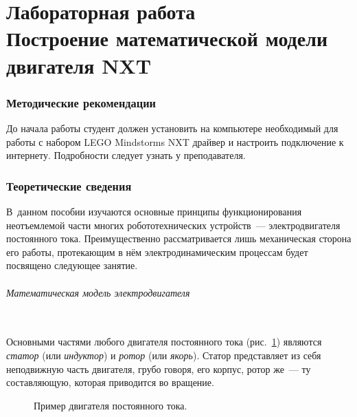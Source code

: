 \documentclass[12pt,a4paper,openany]{extarticle}
\begin{document}
\part*{Лабораторная работа \\
Построение математической модели двигателя NXT}

\section{Методические рекомендации}
\hspace*{\parindent}До начала работы студент должен установить на компьютере необходимый для работы с набором LEGO Mindstorms NXT драйвер и настроить подключение к интернету.
Подробности следует узнать у преподавателя. 

\section{Теоретические сведения}
\hspace*{\parindent}В~данном пособии изучаются основные принципы функционирования неотъемлемой части многих робототехнических устройств~--- электродвигателя постоянного тока.
Преимущественно рассматривается лишь механическая сторона его работы, протекающим в нём электродинамическим процессам будет посвящено следующее занятие. 

\paragraph*{Математическая модель электродвигателя}$\phantom{-}$\\
\hspace*{\parindent}Основными частями любого двигателя постоянного тока (рис.~\ref{elmotor}) являются {\itshape статор} (или \textit{индуктор})  и {\itshape ротор} (или \textit{якорь}).
Статор представляет из себя неподвижную часть двигателя, грубо говоря, его корпус,
ротор же~--- ту составляющую, которая приводится во вращение. 

\begin{figure}[h]
	\begin{minipage}[h]{0.44\linewidth}
	\end{minipage}
	\hfill
	\begin{minipage}[h]{0.55\linewidth}
	\end{minipage}
	\caption{Пример двигателя постоянного тока.}
	\label{elmotor}
\end{figure}
\end{document}
